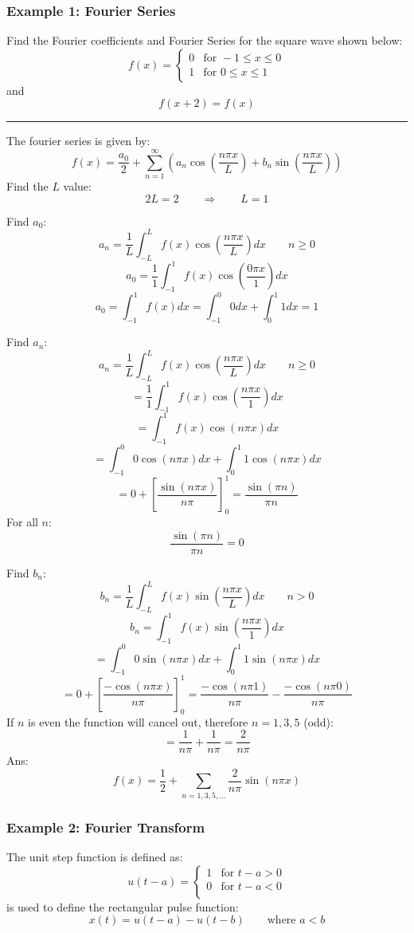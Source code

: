 \subsubsection{Example 1: Fourier Series}
Find the Fourier coefficients and Fourier Series for the square wave shown below:
$$f(x)=\begin{cases}
  0 &  \text{for }-1\leq x\leq0\\
  1 & \text{for }0\leq x\leq 1
\end{cases}$$
and
$$f(x+2)=f(x)$$


\noindent\rule{\textwidth}{1pt}
The fourier series is given by:
$$f(x)=\frac{a_{0}}{2}+\sum_{n=1}^{\infty}\left( a_{n}\cos\left( \frac{n\pi x}{L} \right)+b_{n}\sin\left( \frac{n\pi x}{L} \right) \right)$$
Find the $L$ value:
$$2L=2\qquad \Rightarrow \qquad L=1$$

Find $a_0$:
$$a_n  =\frac{1}{L} \int_{-L}^L f(x) \cos \left(\frac{n \pi x}{L}\right) d x\qquad   n \geq 0$$
$$a_0  =\frac{1}{1} \int_{-1}^1 f(x) \cos \left(\frac{0 \pi x}{1}\right) d x$$
$$a_0  =\int_{-1}^1 f(x) d x=\int_{-1}^0 0 d x+\int_{0}^1 1 d x=1$$

Find $a_n$:
$$a_n  =\frac{1}{L} \int_{-L}^L f(x) \cos \left(\frac{n \pi x}{L}\right) d x\qquad   n \geq 0$$
$$=\frac{1}{1} \int_{-1}^1 f(x) \cos \left(\frac{n \pi x}{1}\right) d x$$
$$=\int_{-1}^1 f(x) \cos \left(n \pi x\right) d x$$
$$=\int_{-1}^0 0 \cos \left(n \pi x\right) d x+\int_{0}^1 1 \cos \left(n \pi x\right) d x$$
$$=0+\left[\frac{\sin(n\pi x)}{n\pi}\right]^1_0=\frac{\sin (\pi  n)}{\pi  n}$$
For all $n$:
$$\frac{\sin (\pi  n)}{\pi  n}=0$$

Find $b_n$:
$$b_n  =\frac{1}{L} \int_{-L}^L f(x) \sin \left(\frac{n \pi x}{L}\right) d x\qquad   n>0$$
$$b_n  =\int_{-1}^1 f(x) \sin \left(\frac{n \pi x}{1}\right) d x$$
$$=\int_{-1}^0 0 \sin \left(n \pi x\right) d x+\int_{0}^1 1 \sin \left(n \pi x\right) d x$$
$$=0+\left[\frac{-\cos(n\pi x)}{n\pi}\right]^1_0=\frac{-\cos(n\pi 1)}{n\pi}-\frac{-\cos(n\pi 0)}{n\pi}$$
If $n$ is even the function will cancel out, therefore $n=1,3,5$ (odd):
$$=\frac{1}{n\pi}+\frac{1}{n\pi}=\frac{2}{n\pi}$$
Ans:
$$f(x)=\frac{1}{2}+\sum_{n=1,3,5,\dots}\frac{2}{n\pi}\sin(n\pi x)$$
\subsubsection{Example 2: Fourier Transform}
The unit step function is defined as:
$$u(t-a)=\begin{cases}
  1&  \text{for }t-a>0\\
  0&  \text{for }t-a<0\\
\end{cases}$$
is used to define the rectangular pulse function:
$$x(t)=u(t-a)-u(t-b)\qquad \text{where }a<b$$

